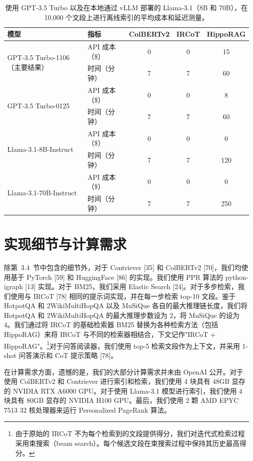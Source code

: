 \documentclass[11pt,UTF8,fontset=fandol]{ctexart}
\begin{document}
\begin{table}[H]\centering
\caption{使用 GPT-3.5 Turbo 以及在本地通过 vLLM 部署的 Llama-3.1（8B 和 70B），在 10,000 个文段上进行离线索引的平均成本和延迟测量。}
\label{tab:18}
\begin{tabular}{llccc}
\toprule
模型 & 指标 & ColBERTv2 & IRCoT & HippoRAG \\
\midrule
\multirow{2}{*}{GPT-3.5 Turbo-1106（主要结果）}
 & API 成本（\$） & 0 & 0 & 15 \\
 & 时间（分钟） & 7 & 7 & 60 \\
\multirow{2}{*}{GPT-3.5 Turbo-0125}
 & API 成本（\$） & 0 & 0 & 8 \\
 & 时间（分钟） & 7 & 7 & 60 \\
\multirow{2}{*}{Llama-3.1-8B-Instruct}
 & API 成本（\$） & 0 & 0 & 0 \\
 & 时间（分钟） & 7 & 7 & 120 \\
\multirow{2}{*}{Llama-3.1-70B-Instruct}
 & API 成本（\$） & 0 & 0 & 0 \\
 & 时间（分钟） & 7 & 7 & 250 \\
\bottomrule
\end{tabular}
\end{table}

\section{实现细节与计算需求}

除第~3.4~节中包含的细节外，对于 Contriever [35] 和 ColBERTv2 [70]，我们均使用基于 PyTorch [59] 和 HuggingFace [86] 的实现。我们使用 PPR 算法的 python-igraph [13] 实现。对于 BM25，我们采用 Elastic Search [24]。对于多步检索，我们使用与 IRCoT [78] 相同的提示词实现，并在每一步检索 top-10 文段。鉴于 HotpotQA 和 2WikiMultiHopQA 以及 MuSiQue 各自的最大推理链长度，我们将 HotpotQA 和 2WikiMultiHopQA 的最大推理步数设为 2，将 MuSiQue 的设为 4。我们通过将 IRCoT 的基础检索器 BM25 替换为各种检索方法（包括 HippoRAG）来将 IRCoT 与不同的检索器相结合，下文记作"IRCoT + HippoRAG"。\footnote{由于原始的 IRCoT 不为每个检索到的文段提供得分，我们对迭代式检索过程采用束搜索（beam search）。每个候选文段在束搜索过程中保持其历史最高得分。}对于问答阅读器，我们使用 top-5 检索文段作为上下文，并采用 1-shot 问答演示和 CoT 提示策略 [78]。

在计算需求方面，遗憾的是，我们的大部分计算需求并未由 OpenAI 公开。对于使用 ColBERTv2 和 Contriever 进行索引和检索，我们使用 4 块具有 48GB 显存的 NVIDIA RTX A6000 GPU。对于使用 Llama-3.1 模型进行索引，我们使用 4 块具有 80GB 显存的 NVIDIA H100 GPU。最后，我们使用 2 颗 AMD EPYC 7513 32 核处理器来运行 Personalized PageRank 算法。
\end{document}
